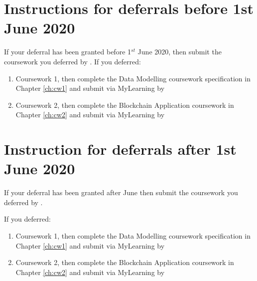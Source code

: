 \section{Instructions for deferrals before 1st June 2020}
If your deferral has been granted before 1$^{st}$ June 2020, then submit the coursework you deferred by . 
If you deferred:
\begin{enumerate}
\item Coursework 1, then complete the Data Modelling coursework specification in Chapter \ref{ch:cw1} and submit via MyLearning by 
\item Coursework 2, then complete the Blockchain Application coursework in Chapter \ref{ch:cw2} and submit via MyLearning by 
\end{enumerate}

\section{Instruction for deferrals after 1st June 2020}
If your deferral has been granted after June then submit the coursework you deferred by .

If you deferred:
\begin{enumerate}
\item Coursework 1, then complete the Data Modelling coursework specification in Chapter \ref{ch:cw1} and submit via MyLearning by 
\item Coursework 2, then complete the Blockchain Application coursework in Chapter \ref{ch:cw2} and submit via MyLearning by 
\end{enumerate}
